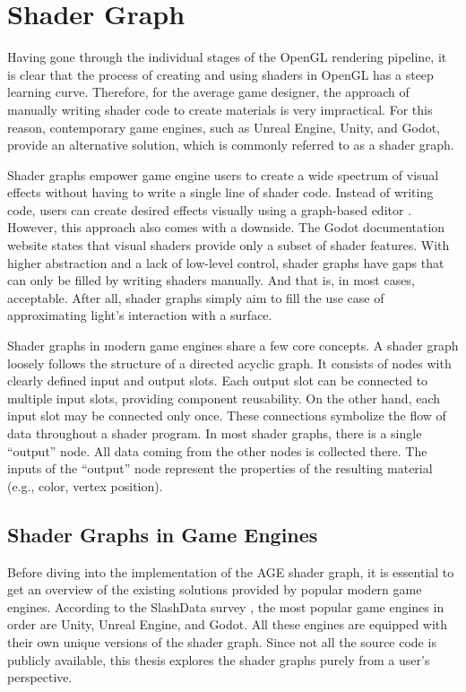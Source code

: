 \documentclass[
  digital,     %
  oneside,     %
  nosansbold,  %
  nocolorbold, %
  lof,         %
  lot,         %
]{fithesis4}
\begin{document}
\chapter{Shader Graph}\label{chap:shader-graph}
Having gone through the individual stages of the OpenGL rendering pipeline, it is clear that the process of creating and using
shaders in OpenGL has a steep learning curve. Therefore, for the average game designer,
the approach of manually writing shader code to create materials is very impractical.
For this reason, contemporary game engines,
such as Unreal Engine, Unity, and Godot, provide an alternative solution, which is commonly referred to as a shader graph.

Shader graphs empower game engine users to create a wide spectrum of visual effects without having to write a single
line of shader code. Instead of writing code, users can create desired effects visually using a graph-based editor
\cite{unity-shader-graph}. However, this approach also comes with a downside. The Godot documentation website
\cite{godot-visual-shaders} states that visual shaders provide only a subset of shader features.
With higher abstraction and a lack of low-level control, shader graphs have gaps that can only be filled
by writing shaders manually. And that is, in most cases, acceptable. After all, shader graphs simply
aim to fill the use case of approximating light's interaction with a surface.

Shader graphs in modern game engines share a few core concepts. A shader graph loosely follows the structure of
a directed acyclic graph. It consists of nodes with clearly defined input and output slots.
Each output slot can be connected to multiple input slots, providing component reusability.
On the other hand, each input slot may be connected only once. These connections symbolize the flow of data
throughout a shader program. In most shader graphs, there is a single \enquote{output} node.
All data coming from the other nodes is collected there. The inputs of the \enquote{output} node represent the properties
of the resulting material (e.g., color, vertex position).

\section{Shader Graphs in Game Engines}
Before diving into the implementation of the AGE shader graph, it is essential to get an overview of the existing solutions
provided by popular modern game engines. According to the SlashData survey \cite{slashdata-game-engines},
the most popular game engines in order are Unity, Unreal Engine, and Godot. All these engines are equipped with
their own unique versions of the shader graph. Since not all the source code is publicly
available, this thesis explores the shader graphs purely from a user's perspective.
\end{document}
